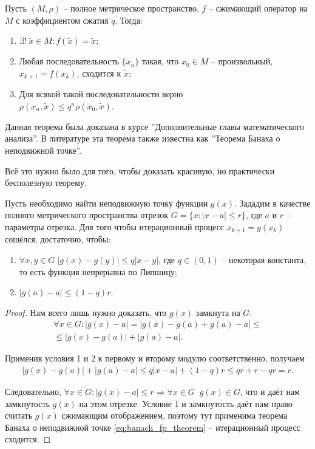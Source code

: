 \documentclass[../main.tex]{subfile}
\begin{document}
\begin{theorem}\label{eq:banach_fp_theorem}
	Пусть $(M,\rho)$ -- полное метрическое пространство, $f$ -- сжимающий
	оператор на $M$ с коэффициентом сжатия $q$. Тогда:
	\begin{enumerate}
		\item $\exists!\;\widetilde{x}\in M: f(\widetilde{x})=\widetilde{x}$;
		\item Любая последовательность $\{x_n\}$ такая, что $x_0 \in M$ --
			произвольный, $x_{k+1}=f(x_k)$, сходится к $\widetilde{x}$;
		\item Для всякой такой последовательности верно\\
			$\rho(x_n, \widetilde{x}) \le q ^ n \rho(x_0, \widetilde{x})$.
	\end{enumerate}
\end{theorem}

Данная теорема была доказана в курсе ''Дополнительные главы математического
анализа''. В литературе эта теорема также известна как ''Теорема Банаха о
неподвижной точке''.

Всё это нужно было для того, чтобы доказать красивую, но практически бесполезную
теорему.

\newpage

\begin{theorem}
	Пусть необходимо найти неподвижную точку функции $g(x)$. Зададим
	в качестве полного метрического пространства отрезок $G=\{x: |x-a| \le r\}$,
	где $a$ и $r$ -- параметры отрезка. Для того чтобы итерационный процесс
	$x_{k+1}=g(x_k)$ сошёлся, достаточно, чтобы:
	\begin{enumerate}
		\item $\forall x,y\in G\;|g(x)-g(y)|\le q|x-y|$, где $q\in(0,1)$ --
			некоторая константа, то есть функция непрерывна по Липшицу;
		\item $|g(a)-a|\le(1-q)r$.
	\end{enumerate}
\end{theorem}

\begin{proof}
	Нам всего лишь нужно доказать, что $g(x)$ замкнута на $G$.
	\begin{multline*}
		\forall x\in G:|g(x)-a|=|g(x)-g(a)+g(a)-a|\le \\
		\le|g(x)-g(a)|+|g(a)-a|.
	\end{multline*}

	Применив условия 1 и 2 к первому и второму модулю соответственно, получаем
	\begin{align*}
		|g(x)-g(a)|+|g(a)-a|\le q|x-a|+(1-q)r\le qr+r-qr=r.
	\end{align*}

	Следовательно, $\forall x\in G: |g(x)-a|\le r\Rightarrow\forall x\in
	G\;\;g(x)\in G$, что и даёт нам замкнутость $g(x)$ на этом отрезке.
	Условие 1 и замкнутость даёт нам право считать $g(x)$ сжимающим
	отображением, поэтому тут применима теорема Банаха о неподвижной точке
	\eqref{eq:banach_fp_theorem} -- итерационный процесс сходится.
\end{proof}
\end{document}
